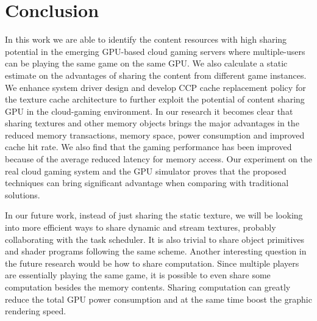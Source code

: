 \documentclass[pageno]{jpaper}
\begin{document}
\section{Conclusion}\label{sec:conclusion}

In this work we are able to identify the content resources with high sharing
potential in the emerging GPU-based cloud gaming servers where multiple-users can be playing the same game on the same GPU. We also calculate a static estimate on the advantages of sharing the content from different game instances. We enhance system driver design and develop CCP cache replacement policy for the texture cache architecture to further exploit the potential of content sharing GPU in the cloud-gaming environment.
In our research it becomes clear that sharing textures and other memory objects brings
the major advantages in the reduced memory transactions, memory space, power consumption and improved cache hit rate. We also find that the gaming performance has been improved because of the average reduced latency for memory access. Our experiment on the real cloud gaming system and the GPU simulator proves that the proposed techniques can bring significant advantage when comparing with traditional solutions.

In our future work, instead of just sharing the static texture, we will be looking into more efficient ways to share dynamic and stream textures, probably collaborating with the task scheduler. It is also trivial to share object primitives and shader programs following the same scheme. Another interesting question in the future research would be how to share computation. Since multiple players are essentially playing the same game, it is possible to even share some computation besides the memory contents. Sharing computation can greatly reduce the total GPU power consumption and at the same time boost the graphic rendering speed.




\end{document}
